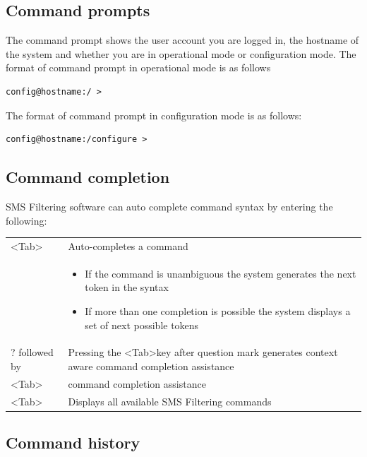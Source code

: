 \documentclass[a4paper,latin]{paper}
\begin{document}
\subsection{Command prompts}

The command prompt shows the user account you are logged in, the hostname of the system and
whether you are in operational mode or configuration mode.\newline\newline
The format of command prompt in operational mode is as follows
\begin{lstlisting}[style=BashInputStyle]
config@hostname:/ >
\end{lstlisting}
The format of command prompt in configuration mode is as follows:
\begin{lstlisting}[style=BashInputStyle]
config@hostname:/configure >
\end{lstlisting}

\subsection{Command completion}

SMS Filtering software can auto complete command syntax by entering the following:\newline

\begin{tabular}{ l | p{} }
	\textless{}Tab\textgreater & Auto-completes a command \\
				   & \begin{itemize} 
        				\item If the command is unambiguous the system generates the next token in the syntax 
					\item If more than one completion is possible the system displays a set of next possible tokens
				     \end{itemize} \\
	? followed by	           &  Pressing the \textless{}Tab\textgreater{}key after question mark generates context aware command completion assistance \\
	\textless{}Tab\textgreater &  command completion assistance \\
	\textless{}Tab\textgreater &  Displays all available SMS Filtering commands
\end{tabular}

\subsection{Command history}
\end{document}

